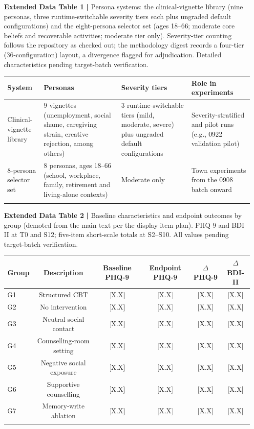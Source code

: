 \documentclass[sn-nature,pdflatex]{sn-jnl}
\begin{document}
\begin{table}[h]
\parbox{0.9\textwidth}{\footnotesize\textbf{Extended Data Table 1 |} Persona systems: the clinical-vignette library (nine personas, three runtime-switchable severity tiers each plus ungraded default configurations) and the eight-persona selector set (ages 18--66; moderate core beliefs and recoverable activities; moderate tier only). Severity-tier counting follows the repository as checked out; the methodology digest records a four-tier (36-configuration) layout, a divergence flagged for adjudication. Detailed characteristics pending target-batch verification.}
\par\smallskip
\centering
\footnotesize
\setlength{\tabcolsep}{4pt}
\begin{tabular}{@{}p{2.5cm}p{3.0cm}p{2.6cm}p{2.9cm}@{}}
\toprule
System & Personas & Severity tiers & Role in experiments \\
\midrule
Clinical-vignette library & 9 vignettes (unemployment, social shame, caregiving strain, creative rejection, among others) & 3 runtime-switchable tiers (mild, moderate, severe) plus ungraded default configurations & Severity-stratified and pilot runs (e.g., 0922 validation pilot) \\
8-persona selector set & 8 personas, ages 18--66 (school, workplace, family, retirement and living-alone contexts) & Moderate only & Town experiments from the 0908 batch onward \\
\botrule
\end{tabular}
\end{table}

\begin{table}[h]
\parbox{0.9\textwidth}{\footnotesize\textbf{Extended Data Table 2 |} Baseline characteristics and endpoint outcomes by group (demoted from the main text per the display-item plan). PHQ-9 and BDI-II at T0 and S12; five-item short-scale totals at S2--S10. All values pending target-batch verification.}
\par\smallskip
\centering
\footnotesize
\begin{tabular}{@{}lccccc@{}}
\toprule
Group & Description & Baseline PHQ-9 & Endpoint PHQ-9 & $\Delta$PHQ-9 & $\Delta$BDI-II \\
\midrule
G1 & Structured CBT & [X.X] & [X.X] & [X.X] & [X.X] \\
G2 & No intervention & [X.X] & [X.X] & [X.X] & [X.X] \\
G3 & Neutral social contact & [X.X] & [X.X] & [X.X] & [X.X] \\
G4 & Counselling-room setting & [X.X] & [X.X] & [X.X] & [X.X] \\
G5 & Negative social exposure & [X.X] & [X.X] & [X.X] & [X.X] \\
G6 & Supportive counselling & [X.X] & [X.X] & [X.X] & [X.X] \\
G7 & Memory-write ablation & [X.X] & [X.X] & [X.X] & [X.X] \\
\botrule
\end{tabular}
\end{table}
\end{document}
